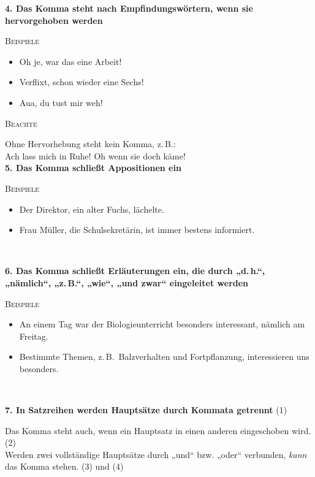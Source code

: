 \documentclass[landscape]{article}
\newcommand{\tbreak}{\\\vspace{-3mm}}
\newcommand*\glqq{„}
\newcommand*\grqq{“}
\newcommand{\gqm}[1]{\glqq #1\grqq}
\newcommand{\zB}{z.\,B.}
\begin{document}
\begin{multicols*}{3}
    \textbf{4. Das Komma steht nach Empfindungswörtern, wenn sie hervorgehoben werden}\tbreak
    
    \textsc{Beispiele}\\

    \begin{itemize}
        \item Oh je, war das eine Arbeit!
        \item Verflixt, schon wieder eine Sechs!
        \item Aua, du tust mir weh!
    \end{itemize}

    \textsc{Beachte}\tbreak

    Ohne Hervorhebung steht kein Komma, \zB:\\ 
    Ach lass mich in Ruhe! Oh wenn sie doch käme!\\

    \textbf{5. Das Komma schließt Appositionen ein}\tbreak

    \textsc{Beispiele}\\

    \begin{itemize}
        \item Der Direktor, ein alter Fuchs, lächelte.
        \item Frau Müller, die Schulsekretärin, ist immer bestens informiert.
    \end{itemize}\quad\tbreak

    \textbf{6. Das Komma schließt Erläuterungen ein, die durch \gqm{d.\,h.}, \gqm{nämlich}, \gqm{\zB}, \gqm{wie}, \gqm{und zwar} eingeleitet werden}\tbreak

    \textsc{Beispiele}\\

    \begin{itemize}
        \item An einem Tag war der Biologieunterricht besonders interessant, nämlich am Freitag.
        \item Bestimmte Themen, \zB\, Balzverhalten und Fortpflanzung, interessieren uns besonders.
    \end{itemize}\quad\tbreak

    \textbf{7. In Satzreihen werden Hauptsätze durch Kommata getrennt} (1)\tbreak

    Das Komma steht auch, wenn ein Hauptsatz in einen anderen eingeschoben wird. (2)\\
    Werden zwei vollständige Hauptsätze durch \gqm{und} bzw. \gqm{oder} verbunden, \textit{kann} das Komma stehen. (3) und (4)\tbreak


\end{multicols*}
\end{document}
